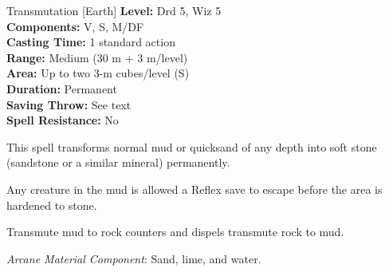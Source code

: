 {Transmutation [Earth]}
{
	\textbf{Level:}
	Drd 5, Wiz 5\\
	\textbf{Components:}
	V, S, M/DF\\
	\textbf{Casting Time:}
	1 standard action\\
	\textbf{Range:}
	Medium (30 m + 3 m/level)\\
	\textbf{Area:}
	Up to two 3-m cubes/level (S)\\
	\textbf{Duration:}
	Permanent\\
	\textbf{Saving Throw:}
	See text\\
	\textbf{Spell Resistance:}
	No\\
}
{
	This spell transforms normal mud or quicksand of any depth into soft stone (sandstone or a similar mineral) permanently.

	Any creature in the mud is allowed a Reflex save to escape before the area is hardened to stone.

	Transmute mud to rock counters and dispels transmute rock to mud.

	\textit{Arcane Material Component}:
	Sand, lime, and water.

}

